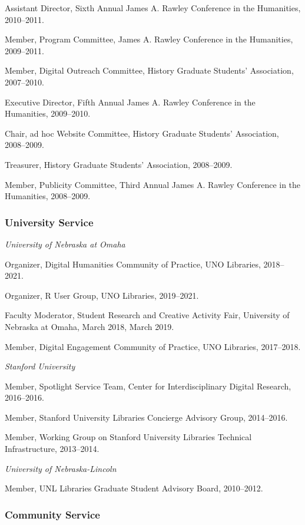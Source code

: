 Assistant Director, Sixth Annual James A. Rawley Conference in the
Humanities, 2010--2011.

Member, Program Committee, James A. Rawley Conference in the Humanities,
2009--2011.

Member, Digital Outreach Committee, History Graduate Students'
Association, 2007--2010.

Executive Director, Fifth Annual James A. Rawley Conference in the
Humanities, 2009--2010.

Chair, ad hoc Website Committee, History Graduate Students' Association,
2008--2009.

Treasurer, History Graduate Students' Association, 2008--2009.

Member, Publicity Committee, Third Annual James A. Rawley Conference in
the Humanities, 2008--2009.

\subsubsection{University Service}\label{university-service}

\emph{University of Nebraska at Omaha}

Organizer, Digital Humanities Community of Practice, UNO Libraries,
2018--2021.

Organizer, R User Group, UNO Libraries, 2019--2021.

Faculty Moderator, Student Research and Creative Activity Fair,
University of Nebraska at Omaha, March 2018, March 2019.

Member, Digital Engagement Community of Practice, UNO Libraries,
2017--2018.

\vspace{.4cm}

\emph{Stanford University}

Member, Spotlight Service Team, Center for Interdisciplinary Digital
Research, 2016--2016.

Member, Stanford University Libraries Concierge Advisory Group,
2014--2016.

Member, Working Group on Stanford University Libraries Technical
Infrastructure, 2013--2014.

\vspace{.4cm}

\emph{University of Nebraska-Lincoln}

Member, UNL Libraries Graduate Student Advisory Board, 2010--2012.

\subsubsection{Community Service}\label{community-service}

